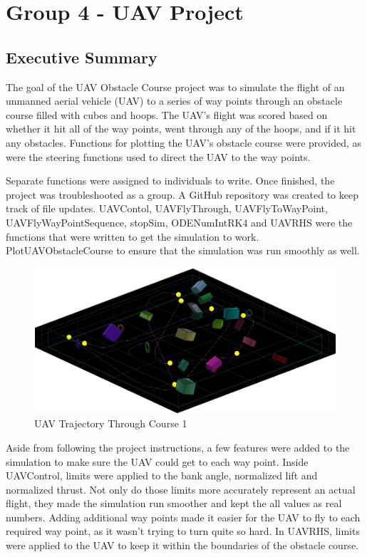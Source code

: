 \documentclass[12pt]{article}
\begin{document}
\section*{\centering Group 4 - UAV Project}
\subsection*{Executive Summary} 

The goal of the UAV Obstacle Course project was to simulate the flight of an unmanned aerial vehicle (UAV) to a series of way points through an obstacle course filled with cubes and hoops. The UAV’s flight was scored based on whether it hit all of the way points, went through any of the hoops, and if it hit any obstacles. Functions for plotting the UAV’s obstacle course were provided, as were the steering functions used to direct the UAV to the way points.

Separate functions were assigned to individuals to write. Once finished, the project was troubleshooted as a group. A GitHub repository was created to keep track of file updates. UAVContol, UAVFlyThrough, UAVFlyToWayPoint, UAVFlyWayPointSequence, stopSim, ODENumIntRK4 and UAVRHS were the functions that were written to get the simulation to work. PlotUAVObstacleCourse to ensure that the simulation was run smoothly as well. 


\begin{figure}
	\begin{center}
		\includegraphics[scale=0.5]{Figure1}
		\caption{UAV Trajectory Through Course 1}
	\end{center}
\end{figure} 

Aside from following the project instructions, a few features were added to the simulation to make sure the UAV could get to each way point. Inside UAVControl, limits were applied to the bank angle, normalized lift and normalized thrust. Not only do those limits more accurately represent an actual flight, they made the simulation run smoother and kept the all values as real numbers. Adding additional way points made it easier for the UAV to fly to each required way point, as it wasn’t trying to turn quite so hard. In UAVRHS, limits were applied to the UAV to keep it within the boundaries of the obstacle course. 
\end{document}
